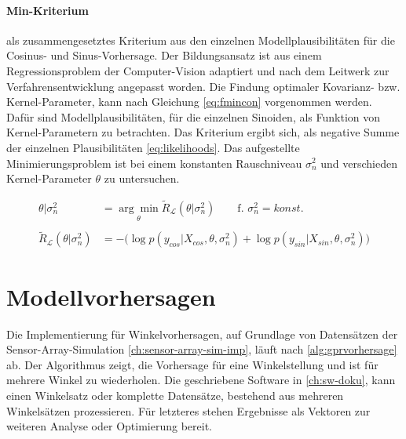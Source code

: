 \clearpage


\paragraph*{Min-Kriterium} als zusammengesetztes Kriterium aus den einzelnen Modellplausibilitäten für die Cosinus- und Sinus-Vorhersage. Der Bildungsansatz ist aus einem Regressionsproblem der Computer-Vision \cite{Guerrero2014} adaptiert und nach dem Leitwerk zur Verfahrensentwicklung \cite{Rasmussen2006} angepasst worden. Die Findung optimaler Kovarianz- bzw. Kernel-Parameter, kann nach Gleichung \autoref{eq:fmincon} vorgenommen werden. Dafür sind Modellplausibilitäten, für die einzelnen Sinoiden, als Funktion von Kernel-Parametern zu betrachten. Das Kriterium ergibt sich, als negative Summe der einzelnen Plausibilitäten \autoref{eq:likelihoods}. Das aufgestellte Minimierungsproblem ist bei einem konstanten Rauschniveau $\sigma_n^2$ und verschieden Kernel-Parameter $\theta$ zu untersuchen.


\begin{align}\label{eq:fmincon}
\theta|\sigma_n^2 &= \underset{\theta}{\arg\min} \tilde{R}_{\mathcal{L}}(\theta|\sigma_n^2) \qquad \text{f. } \sigma_n^2 = konst. \nonumber \\
\\
\tilde{R}_{\mathcal{L}}(\theta|\sigma_n^2) &= -\big( \log p(y_{cos}|X_{cos}, \theta, \sigma_n^2) + \log p(y_{sin}|X_{sin}, \theta, \sigma_n^2) \big) \nonumber
\end{align}


\clearpage


\section{Modellvorhersagen}\label{sec:gprpred}


Die Implementierung für Winkelvorhersagen, auf Grundlage von Datensätzen der Sensor-Array-Simulation \autoref{ch:sensor-array-sim-imp}, läuft nach \autoref{alg:gprvorhersage} ab. Der Algorithmus zeigt, die Vorhersage für eine Winkelstellung und ist für mehrere Winkel zu wiederholen. Die geschriebene Software in \autoref{ch:sw-doku}, kann einen Winkelsatz oder komplette Datensätze, bestehend aus mehreren Winkelsätzen prozessieren. Für letzteres stehen Ergebnisse als Vektoren zur weiteren Analyse oder Optimierung bereit.


